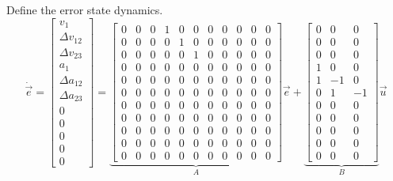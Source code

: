 \documentclass[12pt,onecolumn,reqno]{amsart}
\begin{document}
Define the error state dynamics.
\begin{equation}
  \dot{\vec{e}} = 
  \begin{bmatrix}
    v_{1}             \\
    \Delta v_{12}     \\
    \Delta v_{23}     \\
    a_{1}             \\
    \Delta a_{12}     \\
    \Delta a_{23}     \\ 
    0                 \\
    0                 \\
    0                 \\
    0                 \\
    0                
  \end{bmatrix}
  =
  \underbrace{
  \begin{bmatrix}
    0 & 0 & 0 & 1 & 0 & 0 & 0 & 0 & 0 & 0 & 0 \\
    0 & 0 & 0 & 0 & 1 & 0 & 0 & 0 & 0 & 0 & 0 \\
    0 & 0 & 0 & 0 & 0 & 1 & 0 & 0 & 0 & 0 & 0 \\
    0 & 0 & 0 & 0 & 0 & 0 & 0 & 0 & 0 & 0 & 0 \\
    0 & 0 & 0 & 0 & 0 & 0 & 0 & 0 & 0 & 0 & 0 \\
    0 & 0 & 0 & 0 & 0 & 0 & 0 & 0 & 0 & 0 & 0 \\
    0 & 0 & 0 & 0 & 0 & 0 & 0 & 0 & 0 & 0 & 0 \\
    0 & 0 & 0 & 0 & 0 & 0 & 0 & 0 & 0 & 0 & 0 \\
    0 & 0 & 0 & 0 & 0 & 0 & 0 & 0 & 0 & 0 & 0 \\
    0 & 0 & 0 & 0 & 0 & 0 & 0 & 0 & 0 & 0 & 0 \\
    0 & 0 & 0 & 0 & 0 & 0 & 0 & 0 & 0 & 0 & 0
  \end{bmatrix}
  }_{A}
  \vec{e}
  +
  \underbrace{
  \begin{bmatrix}
    0 & 0 & 0 \\
    0 & 0 & 0 \\
    0 & 0 & 0 \\
    1 & 0 & 0 \\
    1 & -1 & 0 \\
    0 & 1 & -1 \\
    0 & 0 & 0 \\
    0 & 0 & 0 \\
    0 & 0 & 0 \\
    0 & 0 & 0 \\
    0 & 0 & 0
  \end{bmatrix}
  }_{B}
  \vec{u}
\end{equation}
\end{document}
